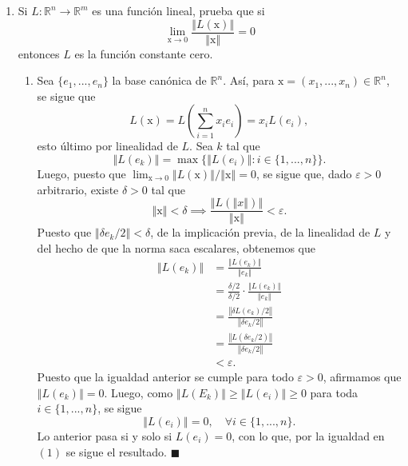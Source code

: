 \documentclass[12pt]{article}
\newcommand{\norm}[1]{\left\Vert#1\right\Vert}
\newcommand{\R}{\mathbb R}
\newcommand{\x}{\mathrm x}
\newcommand{\To}{\longrightarrow}
\begin{document}
\begin{enumerate}
\begin{enumerate}[(a)]
\end{enumerate}

\newpage
\item Si $L:\R^n\To \R^m$ es una funci\'on lineal, prueba que si
\[ \lim_{\x\to 0} \frac{\norm{L(\x)}}{\norm{\x}} = 0 \]
entonces $L$ es la funci\'on constante cero.
\begin{enumerate}
    \item Sea $\{e_1,...,e_n\}$ la base canónica de $\R^n$. Así, para $\x=(x_1,...,x_n) \in \R^n$, se sigue que
    \[
    L(\x) = L\left(\sum_{i=1}^{n}x_ie_i\right) = x_iL(e_i), \tag{1}
    \]
    esto último por linealidad de $L$. Sea $k$ tal que
    \[
    \norm{L(e_k)} = \max\{\norm{L(e_i)}:i\in \{1,...,n\}\}.
    \]
    Luego, puesto que $\lim_{\x\to 0}\norm{L(\x)}/\norm{\x}= 0$, se sigue que, dado $\varepsilon > 0$ arbitrario,
    existe $\delta>0$ tal que
    \[
    \norm{\x}<\delta \implies \frac{\norm{L\left(\norm{x}\right)}}{\norm{\x}} < \varepsilon.
    \]
    Puesto que $\norm{\delta e_k/2} < \delta$, de la implicación previa, de la linealidad de $L$ y del hecho de que la
    norma saca escalares, obtenemos que
    \begin{align*}
        \norm{L(e_k)} &= \frac{\norm{L(e_k)}}{\norm{e_k}} \\
        &= \frac{\delta/2}{\delta/2}\cdot\frac{\norm{L(e_k)}}{\norm{e_k}} \\
        &= \frac{\norm{\delta L(e_k)/2}}{\norm{\delta e_k/2}} \\
        &= \frac{\norm{L(\delta e_k/2)}}{\norm{\delta e_k/2}} \\
        &< \varepsilon.
    \end{align*}
    Puesto que la igualdad anterior se cumple para todo $\varepsilon > 0$, afirmamos que $\norm{L(e_k)}=0$. Luego,
    como $\norm{L(E_k)}\geq \norm{L(e_i)} \geq 0$ para toda $i \in \{1,...,n\}$, se sigue
    \[
    \norm{L(e_i)}=0, \quad \forall i \in \{1,...,n\}.
    \]
    Lo anterior pasa si y solo si $L(e_i)=0$, con lo que, por la igualdad en $(1)$ se sigue el resultado. \hfill $\blacksquare$

\end{enumerate}
\end{enumerate}
\end{document}
